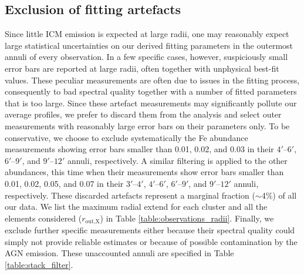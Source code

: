 \documentclass{aa}
\begin{document}
\subsection{Exclusion of fitting artefacts}\label{sect:excl_artefacts}

Since little ICM emission is expected at large radii, one may reasonably expect large statistical uncertainties on our derived fitting parameters in the outermost annuli of every observation. In a few specific cases, however, suspiciously small error bars are reported at large radii, often together with unphysical best-fit values. These peculiar measurements are often due to issues in the fitting process, consequently to bad spectral quality together with a number of fitted parameters that is too large. Since these artefact measurements may significantly pollute our average profiles, we prefer to discard them from the analysis and select outer measurements with reasonably large error bars on their parameters only. To be conservative, we choose to exclude systematically the Fe abundance measurements showing error bars smaller than 0.01, 0.02, and 0.03 in their $4'$--$6'$, $6'$--$9'$, and $9'$--$12'$ annuli, respectively. A similar filtering is applied to the other abundances, this time when their measurements show error bars smaller than 0.01, 0.02, 0.05, and 0.07 in their $3'$--$4'$, $4'$--$6'$, $6'$--$9'$, and $9'$--$12'$ annuli, respectively. These discarded artefacts represent a marginal fraction ($\sim$4\%) of all our data. We list the maximum radial extend for each cluster and all the elements considered ($r_\text{out,X}$) in Table \ref{table:observations_radii}. Finally, we exclude further specific measurements either because their spectral quality could simply not provide reliable estimates or because of possible contamination by the AGN emission. These unaccounted annuli are specified in Table \ref{table:stack_filter}.
\end{document}
